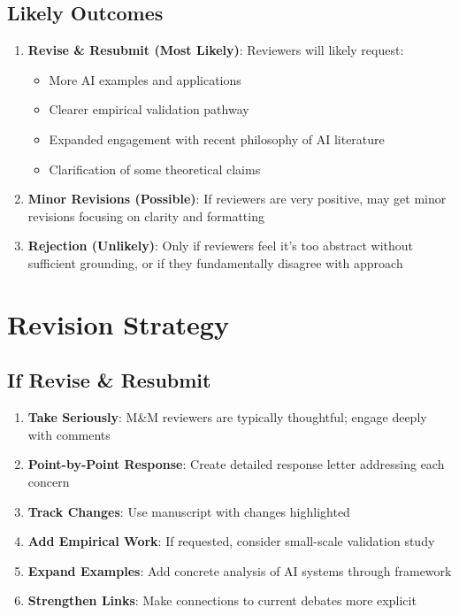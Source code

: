 \documentclass[12pt]{article}
\begin{document}
\subsection{Likely Outcomes}

\begin{enumerate}[leftmargin=*]
\item \textbf{Revise \& Resubmit (Most Likely)}: Reviewers will likely request:
\begin{itemize}
\item More AI examples and applications
\item Clearer empirical validation pathway
\item Expanded engagement with recent philosophy of AI literature
\item Clarification of some theoretical claims
\end{itemize}

\item \textbf{Minor Revisions (Possible)}: If reviewers are very positive, may get minor revisions focusing on clarity and formatting

\item \textbf{Rejection (Unlikely)}: Only if reviewers feel it's too abstract without sufficient grounding, or if they fundamentally disagree with approach
\end{enumerate}

\section{Revision Strategy}

\subsection{If Revise \& Resubmit}

\begin{enumerate}[leftmargin=*]
\item \textbf{Take Seriously}: M\&M reviewers are typically thoughtful; engage deeply with comments
\item \textbf{Point-by-Point Response}: Create detailed response letter addressing each concern
\item \textbf{Track Changes}: Use manuscript with changes highlighted
\item \textbf{Add Empirical Work}: If requested, consider small-scale validation study
\item \textbf{Expand Examples}: Add concrete analysis of AI systems through framework
\item \textbf{Strengthen Links}: Make connections to current debates more explicit
\end{enumerate}
\end{document}
